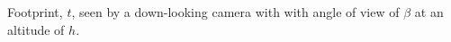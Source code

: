 \label{fig:fov} Footprint, $t$, seen by a down-looking camera with with angle of view of $\beta$ at an altitude of $h$.